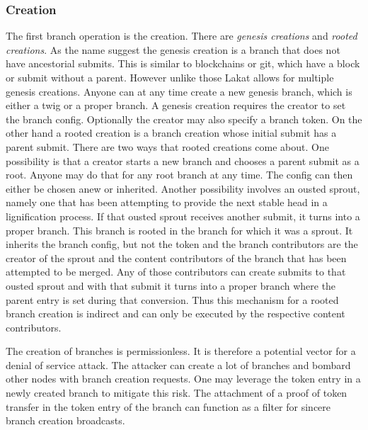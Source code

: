 \documentclass[14pt]{article}
\begin{document}
\subsubsection*{Creation} 
The first branch operation is the creation. There are \textit{genesis creations} and \textit{rooted creations}. As the name suggest the genesis creation is a branch that does not have ancestorial submits. This is similar to blockchains or git, which have a block or submit without a parent. However unlike those Lakat allows for multiple genesis creations. Anyone can at any time create a new genesis branch, which is either a twig or a proper branch. A genesis creation requires the creator to set the branch config. Optionally the creator may also specify a branch token. 
On the other hand a rooted creation is a branch creation whose initial submit has a parent submit. There are two ways that rooted creations come about. One possibility is that a creator starts a new branch and chooses a parent submit as a root. Anyone may do that for any root branch at any time. The config can then either be chosen anew or inherited. Another possibility involves an ousted sprout, namely one that has been attempting to provide the next stable head in a lignification process. If that ousted sprout receives another submit, it turns into a proper branch. This branch is rooted in the branch for which it was a sprout. It inherits the branch config, but not the token and the branch contributors are the creator of the sprout and the content contributors of the branch that has been attempted to be merged. Any of those contributors can create submits to that ousted sprout and with that submit it turns into a proper branch where the parent entry is set during that conversion. Thus this mechanism for a rooted branch creation is indirect and can only be executed by the respective content contributors.

The creation of branches is permissionless. It is therefore a potential vector for a denial of service attack. The attacker can create a lot of branches and bombard other nodes with branch creation requests. One may leverage the token entry in a newly created branch to mitigate this risk. The attachment of a proof of token transfer in the token entry of the branch can function as a filter for sincere branch creation broadcasts.  
\end{document}
